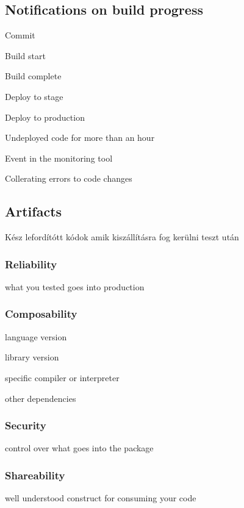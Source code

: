 \documentclass[a4paper,14pt, twocolumn]{extarticle}
\begin{document}
		\subsection{Notifications on build progress}
			\begin{compactitem}
				\item Commit 
				\item Build start 
				\item Build complete 
				\item Deploy to stage 
				\item Deploy to production 
				\item Undeployed code for more than an hour
				\item Event in the monitoring tool 
				\begin{compactitem}
					\item Collerating errors to code changes
				\end{compactitem}
			\end{compactitem}
		\subsection{Artifacts}
			Kész lefordítótt kódok amik kiszállításra fog kerülni teszt után
			\subsubsection{Reliability}
				what you tested goes into production
			\subsubsection{Composability}
				\begin{compactitem}
					\item language version 
					\item library version 
					\item specific compiler or interpreter 
					\item other dependencies 
				\end{compactitem}
			\subsubsection{Security}
				control over what goes into the package
			\subsubsection{Shareability}
				well understood construct for consuming your code
		\newpage
\end{document}
